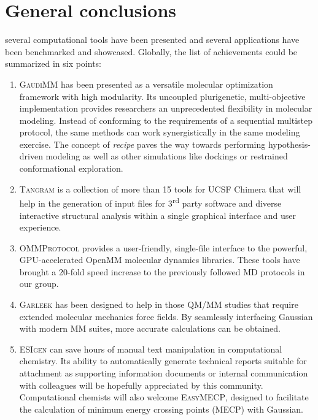 \chapter{General conclusions}
\label{chap:07}

 several computational tools have been presented and several applications have been benchmarked and showcased. Globally, the list of achievements could be summarized in six points:



\begin{enumerate}
	\item \textsc{GaudiMM} has been presented as a versatile molecular optimization framework with high modularity. Its uncoupled plurigenetic, multi-objective implementation provides researchers an unprecedented flexibility in molecular modeling. Instead of conforming to the requirements of a sequential multistep protocol, the same methods can work synergistically in the same modeling exercise. The concept of \textit{recipe} paves the way towards performing hypothesis-driven modeling as well as other simulations like dockings or restrained conformational exploration.

	\item \textsc{Tangram} is a collection of more than 15 tools for UCSF Chimera that will help in the generation of input files for 3\textsuperscript{rd} party software and diverse interactive structural analysis within a single graphical interface and user experience.

	\item \textsc{OMMProtocol} provides a user-friendly, single-file interface to the powerful, GPU-accelerated OpenMM molecular dynamics libraries. These tools have brought a 20-fold speed increase to the previously followed MD protocols in our group.

	\item \textsc{Garleek} has been designed to help in those QM/MM studies that require extended molecular mechanics force fields. By seamlessly interfacing Gaussian with modern MM suites, more accurate calculations can be obtained.

	\item \textsc{ESIgen} can save hours of manual text manipulation in computational chemistry. Its ability to automatically generate technical reports suitable for attachment as supporting information documents or internal communication with colleagues will be hopefully appreciated by this community. Computational chemists will also welcome \textsc{EasyMECP}, designed to facilitate the calculation of minimum energy crossing points (MECP) with Gaussian.

\end{enumerate}


